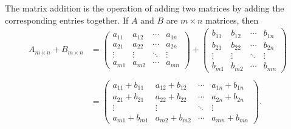 \documentclass{subfile}
\begin{document}
	\begin{definition}
		The matrix addition is the operation of adding two matrices by adding the corresponding entries together. If $A$ and $B$ are $m \times n$ matrices, then
		\begin{align*}
	{A_{m \times n}} + {B_{m \times n}} &= \begin{pmatrix}
		{{a_{11}}}&{{a_{12}}}& \cdots &{{a_{1n}}}\\
		{{a_{21}}}&{{a_{22}}}& \cdots &{{a_{2n}}}\\
		\vdots & \vdots & \ddots & \vdots \\
		{{a_{m1}}}&{{a_{m2}}}& \cdots &{{a_{mn}}}
		\end{pmatrix} + \begin{pmatrix}
		{{b_{11}}}&{{b_{12}}}& \cdots &{{b_{1n}}}\\
		{{b_{21}}}&{{b_{22}}}& \cdots &{{b_{2n}}}\\
		\vdots & \vdots & \ddots & \vdots \\
		{{b_{m1}}}&{{b_{m2}}}& \cdots &{{b_{mn}}}
		\end{pmatrix}\\
	\\
	&= \begin{pmatrix}
		{{a_{11}} + {b_{11}}}&{{a_{12}} + {b_{12}}}& \cdots &{{a_{1n}} + {b_{1n}}}\\
		{{a_{21}} + {b_{21}}}&{{a_{22}} + {b_{22}}}& \cdots &{{a_{2n}} + {b_{2n}}}\\
		\vdots & \vdots & \ddots & \vdots \\
		{{a_{m1}} + {b_{m1}}}&{{a_{m2}} + {b_{m2}}}& \cdots &{{a_{mn}} + {b_{mn}}}
		\end{pmatrix}.
		\end{align*}
		
		
	\end{definition}
	
	
\end{document}
